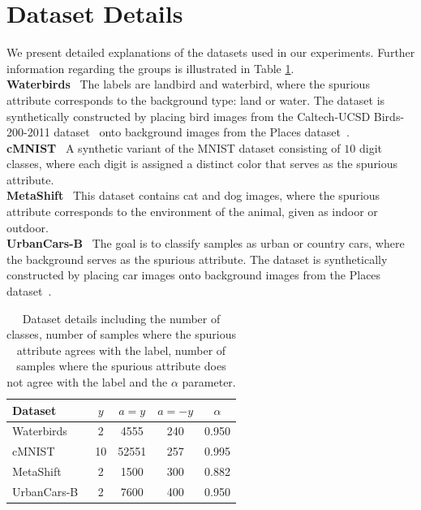 \documentclass[letter,11pt]{article}
\begin{document}
\section{Dataset Details}\label{sec:app_dataset_details}

We present detailed explanations of the datasets used in our experiments. Further information regarding the groups is illustrated in Table \ref{tab:dataset_details}. \\

\noindent \textbf{Waterbirds}~\citep{Waterbirds} The labels are landbird and waterbird, where the spurious attribute corresponds to the background type: land or water. The dataset is synthetically constructed by placing bird images from the Caltech-UCSD Birds-200-2011 dataset~\citep{CaltechBirds} onto background images from the Places dataset~\citep{Places}. \\

\noindent \textbf{cMNIST}~\citep{Cmnist} A synthetic variant of the MNIST dataset consisting of $10$ digit classes, where each digit is assigned a distinct color that serves as the spurious attribute. \\

\noindent \textbf{MetaShift}~\citep{Metashift} This dataset contains cat and dog images, where the spurious attribute corresponds to the environment of the animal, given as indoor or outdoor. \\

\noindent \textbf{UrbanCars-B}~\citep{Urbancars} The goal is to classify samples as urban or country cars, where the background serves as the spurious attribute. The dataset is synthetically constructed by placing car images onto background images from the Places dataset~\citep{Places}.

\begin{table}[t]
\centering
\begin{tabular}{lcccc}
\toprule
Dataset & $y$ & $a=y$ & $a=-y$ & $\alpha$ \\
\midrule
Waterbirds~\citep{Waterbirds} & 2 & 4555 & 240 & 0.950 \\
cMNIST~\citep{Cmnist} & 10 & 52551 & 257 & 0.995 \\
MetaShift~\citep{Metashift} & 2 & 1500 & 300 & 0.882 \\
UrbanCars-B~\citep{Urbancars} & 2 & 7600 & 400 & 0.950 \\
\bottomrule
\end{tabular}
\caption{Dataset details including the number of classes, number of samples where the spurious attribute agrees with the label, number of samples where the spurious attribute does not agree with the label and the $\alpha$ parameter.}
\label{tab:dataset_details}
\end{table}
\end{document}
